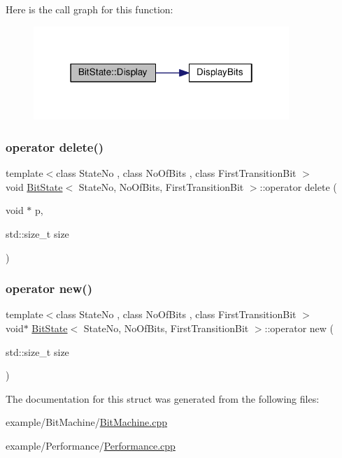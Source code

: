 Here is the call graph for this function\+:
\nopagebreak
\begin{figure}[H]
\begin{center}
\leavevmode
\includegraphics[width=274pt]{struct_bit_state_a3f26c599cf4a72a263d4fc2c2f7e693d_cgraph}
\end{center}
\end{figure}
\mbox{\label{struct_bit_state_ac0109e89bbccfb21a812a92b239ebac2}} 
\subsubsection{\texorpdfstring{operator delete()}{operator delete()}}
{\footnotesize\ttfamily template$<$class State\+No , class No\+Of\+Bits , class First\+Transition\+Bit $>$ \\
void \mbox{\hyperlink{struct_bit_state}{Bit\+State}}$<$ State\+No, No\+Of\+Bits, First\+Transition\+Bit $>$\+::operator delete (\begin{DoxyParamCaption}\item[{void $\ast$}]{p,  }\item[{std\+::size\+\_\+t}]{size }\end{DoxyParamCaption})\hspace{0.3cm}{\ttfamily [inline]}}

\mbox{\label{struct_bit_state_aa7543c5a18aa027866b17e5fe389a413}} 
\subsubsection{\texorpdfstring{operator new()}{operator new()}}
{\footnotesize\ttfamily template$<$class State\+No , class No\+Of\+Bits , class First\+Transition\+Bit $>$ \\
void$\ast$ \mbox{\hyperlink{struct_bit_state}{Bit\+State}}$<$ State\+No, No\+Of\+Bits, First\+Transition\+Bit $>$\+::operator new (\begin{DoxyParamCaption}\item[{std\+::size\+\_\+t}]{size }\end{DoxyParamCaption})\hspace{0.3cm}{\ttfamily [inline]}}



The documentation for this struct was generated from the following files\+:\begin{DoxyCompactItemize}
\item 
example/\+Bit\+Machine/\mbox{\hyperlink{_bit_machine_8cpp}{Bit\+Machine.\+cpp}}\item 
example/\+Performance/\mbox{\hyperlink{_performance_8cpp}{Performance.\+cpp}}\end{DoxyCompactItemize}
